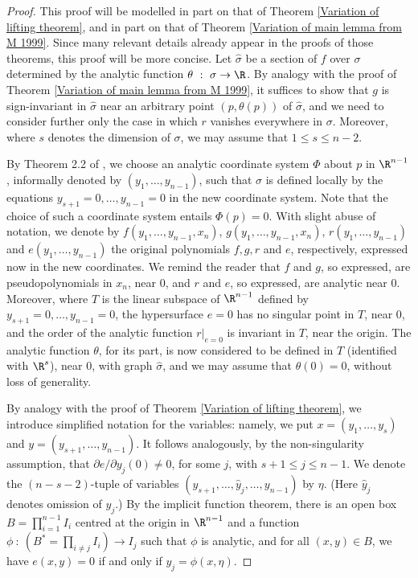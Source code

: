 \documentclass{article}
\begin{document}
\begin{proof}
    This proof will be modelled in part on that of 
    Theorem \ref{Variation of lifting theorem}, and in part on
    that of Theorem \ref{Variation of main lemma from M 1999}.
    Since many relevant details already appear 
    in the proofs of those theorems, this proof will be more concise.
    Let $\hat{\sigma}$ be a section of $f$ over $\sigma$ determined by
    the analytic function $\theta~:~\sigma \rightarrow \R$.
    By analogy with the proof of 
    Theorem \ref{Variation of main lemma from M 1999},
    it suffices to show that $g$ is sign-invariant in $\hat{\sigma}$ 
    near an arbitrary point $(p, \theta(p))$ of $\hat{\sigma}$,
    and we need to consider further only the case in which $r$
    vanishes everywhere in $\sigma$. Moreover, where $s$ denotes
    the dimension of $\sigma$, we may assume that $1 \le s \le n-2$.

    By Theorem 2.2 of \cite{McCallum1988},
    we choose an analytic coordinate system $\Phi$ about $p$
    in $\R^{n-1}$, informally denoted by $(y_1, \ldots, y_{n-1})$,
    such that $\sigma$ is defined locally by the equations
    $y_{s+1} = 0, \ldots, y_{n-1} = 0$ in the new coordinate system.
    Note that the choice of such a coordinate system entails 
    $\Phi(p) = 0$. With slight abuse of notation, we
    denote by $f(y_1, \ldots, y_{n-1}, x_n)$, 
    $g(y_1, \ldots, y_{n-1}, x_n)$,
    $r(y_1, \ldots, y_{n-1})$ and $e(y_1, \ldots, y_{n-1})$
    the original polynomials $f, g, r$ and $e$, respectively,
    expressed now in the new coordinates.
    We remind the reader that $f$ and $g$, so expressed,
    are pseudopolynomials in $x_n$, near $0$, and $r$ and $e$,
    so expressed, are analytic near $0$.
    Moreover, where $T$ is the linear subspace of $\R^{n-1}$
    defined by $y_{s+1} = 0, \ldots, y_{n-1} = 0$,
    the hypersurface $e = 0$ has no singular point in $T$, near $0$, and
    the order of the analytic function
    $r|_{e=0}$ is invariant in $T$, near the origin.
    The analytic function $\theta$, for its part, is now considered
    to be defined in $T$ (identified with $\R^s$), near $0$,
    with graph $\hat{\sigma}$, and we may assume that $\theta(0) = 0$,
    without loss of generality.

    By analogy with the proof of 
    Theorem \ref{Variation of lifting theorem}, we introduce
    simplified notation for the variables: namely, we put
    $x = (y_1, \ldots, y_s)$ and $y = (y_{s+1}, \ldots, y_{n-1})$.
    It follows analogously, 
    by the non-singularity assumption,
    that $\partial e/\partial y_j(0) \neq 0$, for some $j$, with
    $s+1 \le j \le n-1$. We denote the $(n-s-2)$-tuple of variables
    $(y_{s+1}, \ldots, \hat{y}_j, \ldots, y_{n-1})$ by $\eta$.
    (Here $\hat{y}_j$ denotes omission of $y_j$.)
    By the implicit function theorem, there is an open box
    $B = \prod_{i=1}^{n-1} I_i$ centred at the origin in $\R^{n-1}$
    and a function $\phi~:~(B^* = \prod_{i \neq j} I_i) \rightarrow I_j$
    such that $\phi$ is analytic, and for all $(x,y) \in B$,
    we have $e(x,y) = 0$ if and only if $y_j = \phi(x, \eta)$.


\end{proof}
\end{document}

